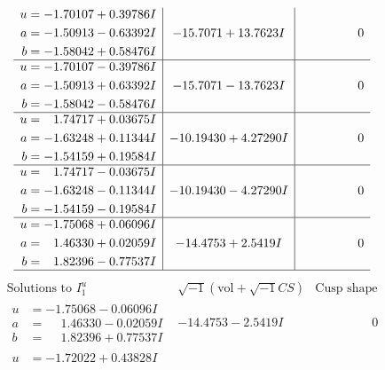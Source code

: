 \documentclass[1p]{elsarticle_modified}
\theoremstyle{definition}
\newcommand{\I}{\sqrt{-1}}
\begin{document}
$$\begin{array}{c|c|c}
\begin{aligned}
u &= -1.70107 + 0.39786 I \\
a &= -1.50913 - 0.63392 I \\
b &= -1.58042 + 0.58476 I\end{aligned}
 & -15.7071 + 13.7623 I & \phantom{-0.000000 } 0 \\ \hline\begin{aligned}
u &= -1.70107 - 0.39786 I \\
a &= -1.50913 + 0.63392 I \\
b &= -1.58042 - 0.58476 I\end{aligned}
 & -15.7071 - 13.7623 I & \phantom{-0.000000 } 0 \\ \hline\begin{aligned}
u &= \phantom{-}1.74717 + 0.03675 I \\
a &= -1.63248 + 0.11344 I \\
b &= -1.54159 + 0.19584 I\end{aligned}
 & -10.19430 + 4.27290 I & \phantom{-0.000000 } 0 \\ \hline\begin{aligned}
u &= \phantom{-}1.74717 - 0.03675 I \\
a &= -1.63248 - 0.11344 I \\
b &= -1.54159 - 0.19584 I\end{aligned}
 & -10.19430 - 4.27290 I & \phantom{-0.000000 } 0 \\ \hline\begin{aligned}
u &= -1.75068 + 0.06096 I \\
a &= \phantom{-}1.46330 + 0.02059 I \\
b &= \phantom{-}1.82396 - 0.77537 I\end{aligned}
 & -14.4753 + 2.5419 I & \phantom{-0.000000 } 0\\
 \hline 
 \end{array}$$\newpage$$\begin{array}{c|c|c}  
\text{Solutions to }I^u_{1}& \I (\text{vol} + \sqrt{-1}CS) & \text{Cusp shape}\\
 \hline 
\begin{aligned}
u &= -1.75068 - 0.06096 I \\
a &= \phantom{-}1.46330 - 0.02059 I \\
b &= \phantom{-}1.82396 + 0.77537 I\end{aligned}
 & -14.4753 - 2.5419 I & \phantom{-0.000000 } 0 \\ \hline\begin{aligned}
u &= -1.72022 + 0.43828 I \\

\end{aligned}
\end{array}$$
\end{document}

